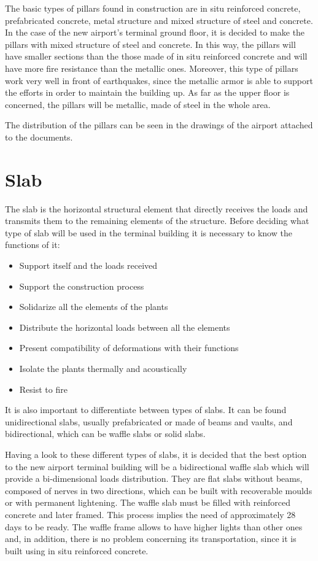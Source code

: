 The basic types of pillars found in construction are in situ reinforced concrete, prefabricated concrete, metal structure and mixed structure of steel and concrete. In the case of the new airport's terminal ground floor, it is decided to make the pillars with mixed structure of steel and concrete. In this way, the pillars will have smaller sections than the those made of in situ reinforced concrete and will have more fire resistance than the metallic ones. Moreover, this type of pillars work very well in front of earthquakes, since the metallic armor is able to support the efforts in order to maintain the building up. As far as the upper floor is concerned, the pillars will be metallic, made of steel in the whole area.

The distribution of the pillars can be seen in the drawings of the airport attached to the documents.

	\section{Slab}
The slab is the horizontal structural element that directly receives the loads and transmits them to the remaining elements of the structure. Before deciding what type of slab will be used in the terminal building it is necessary to know the
functions of it:

\begin{itemize}
		\item Support itself and the loads received
		\item Support the construction process
		\item Solidarize all the elements of the plants
		\item Distribute the horizontal loads between all the elements
		\item Present compatibility of deformations with their functions
		\item Isolate the plants thermally and acoustically
		\item Resist to fire
\end{itemize}

It is also important to differentiate between types of slabs. It can be found unidirectional slabs, usually prefabricated or made of beams and vaults, and bidirectional, which can be waffle slabs or solid slabs.

Having a look to these different types of slabs, it is decided that the best option to the new airport terminal building will be a bidirectional waffle slab which will provide a bi-dimensional loads distribution. They are flat slabs without beams, composed of nerves in two directions, which can be built with recoverable moulds or with permanent lightening. The waffle slab must be filled with reinforced concrete and later framed. This process implies the need of approximately 28 days to be ready. The waffle frame allows to have higher lights than other ones and, in addition, there is no problem concerning its transportation, since it is built using in situ reinforced concrete.

